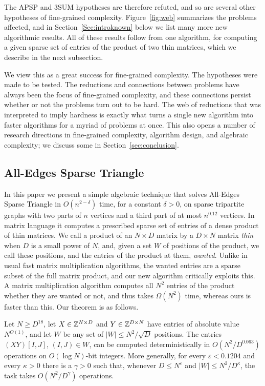The APSP and $3$SUM hypotheses are therefore refuted, and so are several other hypotheses of fine-grained complexity. Figure~\ref{fig:web} summarizes the problems affected, and in Section~\ref{Sec:introknown} below we list many more new algorithmic results. All of these results follow from one algorithm, for computing a given sparse set of entries of the product of two thin matrices, which we describe in the next subsection.

We view this as a great success for fine-grained complexity. The hypotheses were made to be tested.
The reductions and connections between problems have always been the focus of fine-grained complexity, and these connections persist whether or not the problems turn out to be hard.
The web of reductions that was interpreted to imply hardness is exactly what turns a single new algorithm into faster algorithms for a myriad of problems at once.
This also opens a number of research directions in fine-grained complexity, algorithm design, and algebraic complexity; we discuss some in Section~\ref{sec:conclusion}.

\subsection{All-Edges Sparse Triangle}
In this paper we present a simple algebraic technique that solves All-Edges Sparse Triangle in $O(n^{2-\delta})$ time, for a constant $\delta>0$, on sparse tripartite graphs with two parts of $n$ vertices and a third part of at most $n^{0.12}$ vertices. In matrix language it computes a prescribed sparse set of entries of a dense product of thin matrices. We call a product of an $N\times D$ matrix by a $D\times N$ matrix \emph{thin} when $D$ is a small power of $N$, and, given a set $W$ of positions of the product, we call these positions, and the entries of the product at them, \emph{wanted}. Unlike in usual fast matrix multiplication algorithms, the wanted entries are a sparse subset of the full matrix product, and our new algorithm critically exploits this. A matrix multiplication algorithm computes all $N^2$ entries of the product whether they are wanted or not, and thus takes $\Omega(N^2)$ time, whereas ours is faster than this. Our theorem is as follows.

\begin{theorem}\label{thm:intro}
Let $N\ge D^{18}$, let $X\in\mathbb{Z}^{N\times D}$ and $Y\in\mathbb{Z}^{D\times N}$ have entries of absolute value $N^{O(1)}$, and let $W$ be any set of $|W|\le N^2/\sqrt D$ positions. The entries $(XY)[I,J]$, $(I,J)\in W$, can be computed deterministically in $O(N^2/D^{0.063})$ operations on $O(\log N)$-bit integers. More generally, for every $\varepsilon<0.1204$ and every $\kappa>0$ there is a $\gamma>0$ such that, whenever $D\le N^{\varepsilon}$ and $|W|\le N^2/D^{\kappa}$, the task takes $O(N^2/D^{\gamma})$ operations.
\end{theorem}

